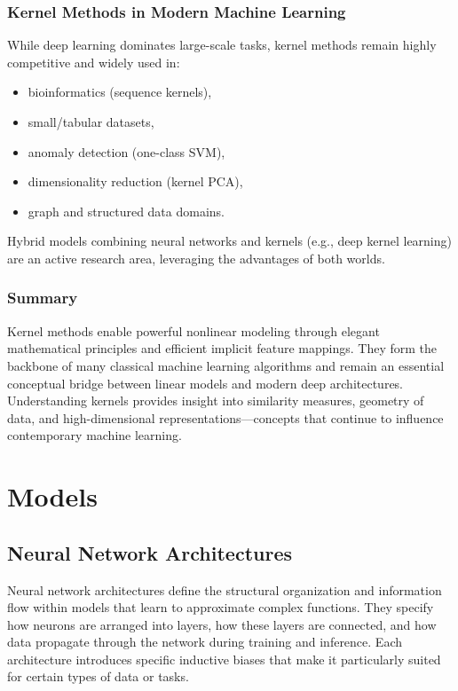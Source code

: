 \documentclass[12pt,a4paper]{report}
\begin{document}
\vspace{1em}
\subsection{Kernel Methods in Modern Machine Learning}

While deep learning dominates large-scale tasks, kernel methods remain highly competitive and widely used in:
\begin{itemize}
    \item bioinformatics (sequence kernels),
    \item small/tabular datasets,
    \item anomaly detection (one-class SVM),
    \item dimensionality reduction (kernel PCA),
    \item graph and structured data domains.
\end{itemize}

Hybrid models combining neural networks and kernels (e.g., deep kernel learning) are an active research area, leveraging the advantages of both worlds.

\vspace{1em}
\subsection{Summary}

Kernel methods enable powerful nonlinear modeling through elegant mathematical principles and efficient implicit feature mappings.  
They form the backbone of many classical machine learning algorithms and remain an essential conceptual bridge between linear models and modern deep architectures.  
Understanding kernels provides insight into similarity measures, geometry of data, and high-dimensional representations—concepts that continue to influence contemporary machine learning.



\chapter{Models}

\section{Neural Network Architectures}

Neural network architectures define the structural organization and information flow within models that learn to approximate complex functions. 
They specify how neurons are arranged into layers, how these layers are connected, and how data propagate through the network during training and inference. 
Each architecture introduces specific inductive biases that make it particularly suited for certain types of data or tasks.
\end{document}
